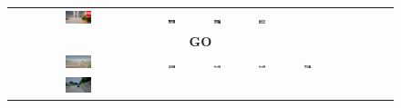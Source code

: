 \begin{figure}[htbp]
\begin{tabular}{cccccccccc}
        \includegraphics[width=0.2\textwidth]{img/diversity/stop_07.png} &
        \includegraphics[width=0.2\textwidth]{img/diversity/stop_08.png} &
        \includegraphics[width=0.2\textwidth]{img/diversity/stop_09.png} &
        \includegraphics[width=0.2\textwidth]{img/diversity/stop_10.png} \\
        \multicolumn{10}{c}{\textbf{GO}} \\
        \includegraphics[width=0.2\textwidth]{img/diversity/go_01.png} &
        \includegraphics[width=0.2\textwidth]{img/diversity/go_02.png} &
        \includegraphics[width=0.2\textwidth]{img/diversity/go_03.png} &
        \includegraphics[width=0.2\textwidth]{img/diversity/go_04.png} &
        \includegraphics[width=0.2\textwidth]{img/diversity/go_05.png} & \\
        \includegraphics[width=0.2\textwidth]{img/diversity/go_06.png} &

\end{tabular}
\end{figure}
